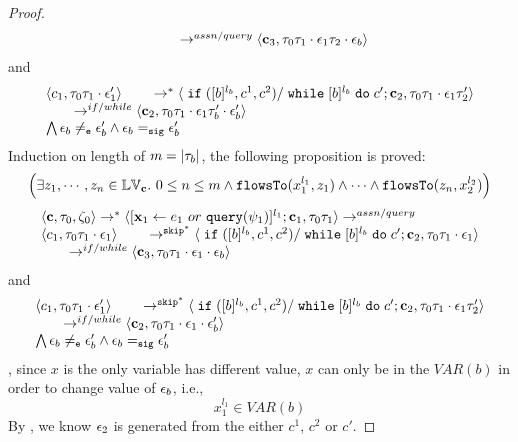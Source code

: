 \begin{proof}
\[\begin{array}{l}
  \qquad \rightarrow^{assn/query} 
  \langle {\boldsymbol{\mathbf{c}}}_3,  \mathtt{\tau}_0 \mathtt{\tau}_1 \cdot \mathtt{\epsilon}_1 \mathtt{\tau}_2 \cdot \mathtt{\epsilon}_b \rangle 
\end{array}
 \]
and 
 \[
  \begin{array}{l}   
 \langle c_1, \mathtt{\tau}_0 \mathtt{\tau}_1 \cdot \mathtt{\epsilon}_1' \rangle 
  \qquad \rightarrow^{*} 
  \langle \;\mathtt{if}\;([b]{}^{l_b}, c^1, c^2) / \;\mathtt{while}\; [b]{}^{l_b} \;\mathtt{do}\; c'; {\boldsymbol{\mathbf{c}}}_2, 
  \mathtt{\tau}_0 \mathtt{\tau}_1 \cdot \mathtt{\epsilon}_1 \mathtt{\tau}_2' \rangle 
  \\
  \qquad \rightarrow^{if/while} 
  \langle {\boldsymbol{\mathbf{c}}}_2,  \mathtt{\tau}_0 \mathtt{\tau}_1 \cdot \mathtt{\epsilon}_1 \mathtt{\tau}_b' \cdot \mathtt{\epsilon}_b' \rangle 
\\
\bigwedge
\mathtt{\epsilon}_b \neq_{\mathtt{e}} \mathtt{\epsilon}_b' \land \mathtt{\epsilon}_b =_{\mathtt{sig}} \mathtt{\epsilon}_b'
\end{array}
 \]
Induction on length of $m = |\mathtt{\tau}_b|$, the following proposition is proved:
%
 \[
 \Big( \exists z_1, \cdots, z_n \in \mathbb{LV}_{{\boldsymbol{\mathbf{c}}}}. ~ 0 \leq n \leq m \land
  \mathtt{flowsTo}(x_1^{l_1}, z_1) 
  \land \cdots \land \mathtt{flowsTo}(z_n, x_2^{l_2}) \Big)
  \]
\[
  \begin{array}{l}   
\langle {\boldsymbol{\mathbf{c}}}, \mathtt{\tau}_0, \mathtt{\zeta}_0 \rangle \rightarrow^{*} 
\langle [\mathrel{ {\boldsymbol{\mathbf{x}}}_1 \leftarrow e_1~ or ~ {\tt query}(\psi_1) }]^{l_1} ; {\boldsymbol{\mathbf{c}}}_1, \mathtt{\tau}_0 \mathtt{\tau}_1 \rangle  \rightarrow^{assn/query}
\\ 
 \langle c_1, \mathtt{\tau}_0 \mathtt{\tau}_1 \cdot \mathtt{\epsilon}_1 \rangle 
  \qquad \rightarrow^{\mathtt{skip}^*} 
  \langle \;\mathtt{if}\;([b]{}^{l_b}, c^1, c^2) / \;\mathtt{while}\; [b]{}^{l_b} \;\mathtt{do}\; c'; {\boldsymbol{\mathbf{c}}}_2, 
  \mathtt{\tau}_0 \mathtt{\tau}_1 \cdot \mathtt{\epsilon}_1 \rangle 
  \\
  \qquad \rightarrow^{if/while} 
  \langle {\boldsymbol{\mathbf{c}}}_3,  \mathtt{\tau}_0 \mathtt{\tau}_1 \cdot \mathtt{\epsilon}_1 \cdot \mathtt{\epsilon}_b \rangle 
\end{array}
 \]
and 
 \[
  \begin{array}{l}   
 \langle c_1, \mathtt{\tau}_0 \mathtt{\tau}_1 \cdot \mathtt{\epsilon}_1' \rangle 
  \qquad \rightarrow^{\mathtt{skip}^*} 
  \langle \;\mathtt{if}\;([b]{}^{l_b}, c^1, c^2) / \;\mathtt{while}\; [b]{}^{l_b} \;\mathtt{do}\; c'; {\boldsymbol{\mathbf{c}}}_2, 
  \mathtt{\tau}_0 \mathtt{\tau}_1 \cdot \mathtt{\epsilon}_1 \mathtt{\tau}_2' \rangle 
  \\
  \qquad \rightarrow^{if/while} 
  \langle {\boldsymbol{\mathbf{c}}}_2,  \mathtt{\tau}_0 \mathtt{\tau}_1 \cdot \mathtt{\epsilon}_1 \cdot \mathtt{\epsilon}_b' \rangle 
\\
\bigwedge
\mathtt{\epsilon}_b \neq_{\mathtt{e}} \mathtt{\epsilon}_b' \land \mathtt{\epsilon}_b =_{\mathtt{sig}} \mathtt{\epsilon}_b'
\end{array}
 \]
 , since $x$ is the only variable has different value, $x$ can only be in the $VAR(b)$ in order to change value of $\mathtt{\epsilon}_b$, i.e.,
 \[
 x_1^{l_1} \in VAR(b)
 \]
 By , we know $\mathtt{\epsilon}_2$ is generated from the either $c^1$, $c^2$ or $c'$.

\end{proof}
